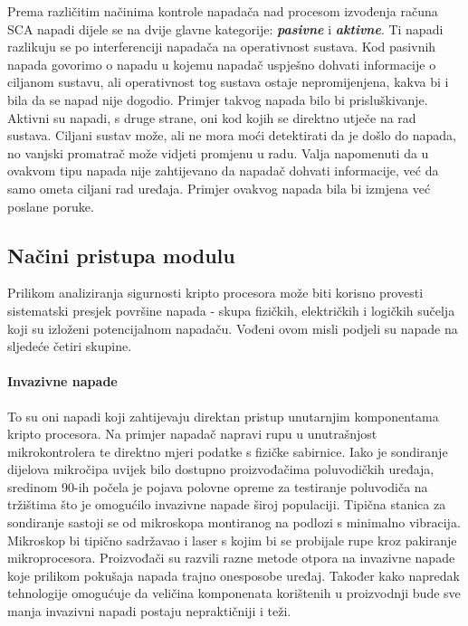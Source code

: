 \documentclass[times, utf8, diplomski]{fer}
\begin{document}
Prema različitim načinima kontrole napadača nad procesom izvođenja računa SCA napadi dijele se na dvije glavne kategorije: \textit{\textbf{pasivne}} i \textit{\textbf{aktivne}}. Ti napadi razlikuju se po interferenciji napadača na operativnost sustava. Kod pasivnih napada govorimo o napadu u kojemu napadač uspješno dohvati informacije o ciljanom sustavu, ali operativnost tog sustava ostaje nepromijenjena, kakva bi i bila da se napad nije dogodio. Primjer takvog napada bilo bi prisluškivanje. Aktivni su napadi, s druge strane, oni kod kojih se direktno utječe na rad sustava. Ciljani sustav može, ali ne mora moći detektirati da je došlo do napada, no vanjski promatrač može vidjeti promjenu u radu. Valja napomenuti da u ovakvom tipu napada nije zahtijevano da napadač dohvati informacije, već da samo ometa ciljani rad uređaja. Primjer ovakvog napada bila bi izmjena već poslane poruke.

\subsection{Načini pristupa modulu}

Prilikom analiziranja sigurnosti kripto procesora može biti korisno provesti sistematski presjek površine napada - skupa fizičkih, električkih i logičkih sučelja koji su izloženi potencijalnom napadaču. Vođeni ovom misli \cite{anderson2006cryptographic} podjeli su napade na sljedeće četiri skupine.

\paragraph{Invazivne napade }
To su oni napadi koji zahtijevaju direktan pristup unutarnjim komponentama kripto procesora. Na primjer napadač napravi rupu u unutrašnjost mikrokontrolera te direktno mjeri podatke s fizičke sabirnice. Iako je sondiranje dijelova mikročipa uvijek bilo dostupno proizvođačima poluvodičkih uređaja, sredinom 90-ih počela je pojava polovne opreme za testiranje poluvodiča na tržištima što je omogućilo invazivne napade široj populaciji. Tipična stanica za sondiranje sastoji se od mikroskopa montiranog na podlozi s minimalno vibracija. Mikroskop bi tipično sadržavao i laser s kojim bi se probijale rupe kroz pakiranje mikroprocesora. Proizvođači su razvili razne metode otpora na invazivne napade koje prilikom pokušaja napada trajno onesposobe uređaj. Također kako napredak tehnologije omogućuje da veličina komponenata korištenih u proizvodnji bude sve manja invazivni napadi postaju nepraktičniji i teži.
\end{document}
